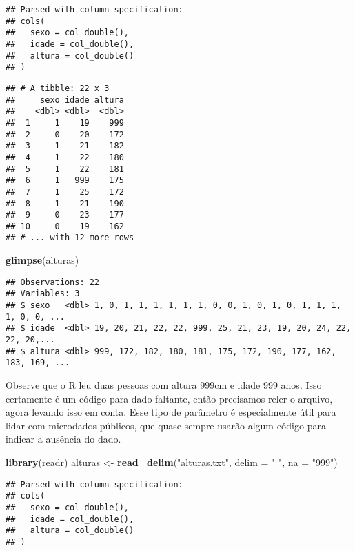 \documentclass[
]{article}
\newenvironment{Shaded}{\begin{snugshade}}{\end{snugshade}}
\newcommand{\DataTypeTok}[1]{\textcolor[rgb]{0.13,0.29,0.53}{#1}}
\newcommand{\KeywordTok}[1]{\textcolor[rgb]{0.13,0.29,0.53}{\textbf{#1}}}
\newcommand{\NormalTok}[1]{#1}
\newcommand{\StringTok}[1]{\textcolor[rgb]{0.31,0.60,0.02}{#1}}
\begin{document}
\begin{verbatim}
## Parsed with column specification:
## cols(
##   sexo = col_double(),
##   idade = col_double(),
##   altura = col_double()
## )
\end{verbatim}

\begin{verbatim}
## # A tibble: 22 x 3
##     sexo idade altura
##    <dbl> <dbl>  <dbl>
##  1     1    19    999
##  2     0    20    172
##  3     1    21    182
##  4     1    22    180
##  5     1    22    181
##  6     1   999    175
##  7     1    25    172
##  8     1    21    190
##  9     0    23    177
## 10     0    19    162
## # ... with 12 more rows
\end{verbatim}

\begin{Shaded}
\begin{Highlighting}[]
\KeywordTok{glimpse}\NormalTok{(alturas)}
\end{Highlighting}
\end{Shaded}

\begin{verbatim}
## Observations: 22
## Variables: 3
## $ sexo   <dbl> 1, 0, 1, 1, 1, 1, 1, 1, 0, 0, 1, 0, 1, 0, 1, 1, 1, 1, 0, 0, ...
## $ idade  <dbl> 19, 20, 21, 22, 22, 999, 25, 21, 23, 19, 20, 24, 22, 22, 20,...
## $ altura <dbl> 999, 172, 182, 180, 181, 175, 172, 190, 177, 162, 183, 169, ...
\end{verbatim}

Observe que o R leu duas pessoas com altura 999cm e idade 999 anos. Isso
certamente é um código para dado faltante, então precisamos reler o
arquivo, agora levando isso em conta. Esse tipo de parâmetro é
especialmente útil para lidar com microdados públicos, que quase sempre
usarão algum código para indicar a ausência do dado.

\begin{Shaded}
\begin{Highlighting}[]
\KeywordTok{library}\NormalTok{(readr)}
\NormalTok{alturas <-}\StringTok{ }\KeywordTok{read_delim}\NormalTok{(}\StringTok{"alturas.txt"}\NormalTok{, }
                     \DataTypeTok{delim =} \StringTok{" "}\NormalTok{,}
                     \DataTypeTok{na =} \StringTok{"999"}\NormalTok{)}
\end{Highlighting}
\end{Shaded}

\begin{verbatim}
## Parsed with column specification:
## cols(
##   sexo = col_double(),
##   idade = col_double(),
##   altura = col_double()
## )
\end{verbatim}
\end{document}
